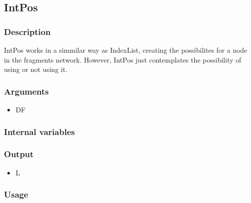 \subsection{IntPos}
\subsubsection{Description}
IntPos works in a simmilar way as IndexList, creating the possibilites for a node in the fragments network. However, IntPos just contemplates the possibility of using or not using it.
\subsubsection{Arguments}
\begin{itemize}
\item DF
\end{itemize}
\subsubsection{Internal variables}
\subsubsection{Output}
\begin{itemize}
\item L
\end{itemize}
\subsubsection{Usage}
